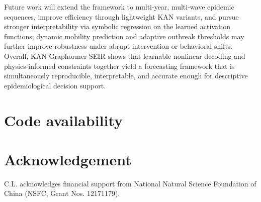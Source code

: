 \documentclass[10pt,letterpaper]{article}
\begin{document}
	Future work will extend the framework to multi-year, multi-wave epidemic sequences, improve efficiency through lightweight KAN variants, and pursue stronger interpretability via symbolic regression on the learned activation functions; dynamic mobility prediction and adaptive outbreak thresholds may further improve robustness under abrupt intervention or behavioral shifts. Overall, KAN-Graphormer-SEIR shows that learnable nonlinear decoding and physics-informed constraints together yield a forecasting framework that is simultaneously reproducible, interpretable, and accurate enough for descriptive epidemiological decision support.
	
	
	\section*{Code availability}	
	
	
	
	
	
	
	
	
	
	
	\section*{Acknowledgement}
	C.L. acknowledges financial support from National Natural Science Foundation of China (NSFC, Grant Nos. 12171179). 	
	
	
	
	
	
	
	
	
	
	
	
\end{document}

